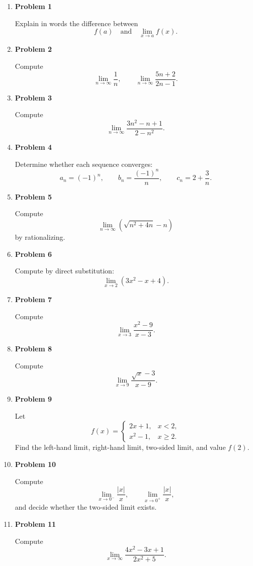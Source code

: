 \begin{enumerate}
\item \textbf{Problem 1}\par
Explain in words the difference between
\[
f(a)
\quad\text{and}\quad
\lim_{x\to a}f(x).
\]

\item \textbf{Problem 2}\par
Compute
\[
\lim_{n\to\infty}\frac{1}{n},
\qquad
\lim_{n\to\infty}\frac{5n+2}{2n-1}.
\]

\item \textbf{Problem 3}\par
Compute
\[
\lim_{n\to\infty}\frac{3n^2-n+1}{2-n^2}.
\]

\item \textbf{Problem 4}\par
Determine whether each sequence converges:
\[
a_n=(-1)^n,
\qquad
b_n=\frac{(-1)^n}{n},
\qquad
c_n=2+\frac{3}{n}.
\]

\item \textbf{Problem 5}\par
Compute
\[
\lim_{n\to\infty}\left(\sqrt{n^2+4n}-n\right)
\]
by rationalizing.

\item \textbf{Problem 6}\par
Compute by direct substitution:
\[
\lim_{x\to2}(3x^2-x+4).
\]

\item \textbf{Problem 7}\par
Compute
\[
\lim_{x\to3}\frac{x^2-9}{x-3}.
\]

\item \textbf{Problem 8}\par
Compute
\[
\lim_{x\to9}\frac{\sqrt{x}-3}{x-9}.
\]

\item \textbf{Problem 9}\par
Let
\[
f(x)=
\begin{cases}
2x+1,&x<2,\\
x^2-1,&x\ge2.
\end{cases}
\]
Find the left-hand limit, right-hand limit, two-sided limit, and value \(f(2)\).

\item \textbf{Problem 10}\par
Compute
\[
\lim_{x\to0^-}\frac{|x|}{x},
\qquad
\lim_{x\to0^+}\frac{|x|}{x},
\]
and decide whether the two-sided limit exists.

\item \textbf{Problem 11}\par
Compute
\[
\lim_{x\to\infty}\frac{4x^2-3x+1}{2x^2+5}.
\]


\end{enumerate}
